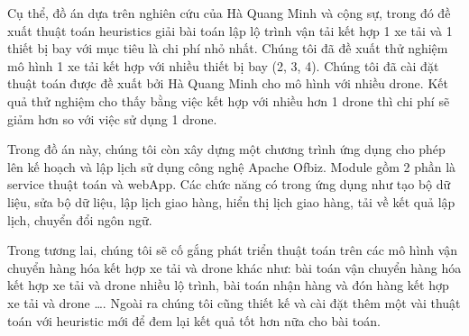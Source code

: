 \documentclass[a4paper,12pt]{report}
\begin{document}
Cụ thể, đồ án dựa trên nghiên cứu của Hà Quang Minh và cộng sự, trong đó đề xuất thuật toán heuristics giải bài toán lập lộ trình vận tải kết hợp 1 xe tải và 1 thiết bị bay với mục tiêu là chi phí nhỏ nhất. Chúng tôi đã đề xuất thử nghiệm mô hình 1 xe tải kết hợp với nhiều thiết bị bay (2, 3, 4). Chúng tôi đã cài đặt thuật toán được đề xuất bởi Hà Quang Minh cho mô hình với nhiều drone. Kết quả thử nghiệm cho thấy bằng việc kết hợp với nhiều hơn 1 drone thì chi phí sẽ giảm hơn so với việc sử dụng 1 drone.

Trong đồ án này, chúng tôi còn xây dựng một chương trình ứng dụng cho phép lên kế hoạch và lập lịch sử dụng công nghệ Apache Ofbiz. Module gồm 2 phần là service thuật toán và webApp. Các chức năng có trong ứng dụng như tạo bộ dữ liệu, sửa bộ dữ liệu, lập lịch giao hàng, hiển thị lịch giao hàng, tải về kết quả lập lịch, chuyển đổi ngôn ngữ. 

Trong tương lai, chúng tôi sẽ cố gắng phát triển thuật toán trên các mô hình vận chuyển hàng hóa kết hợp xe tải và drone khác như: bài toán vận chuyển hàng hóa kết hợp xe tải và drone nhiều lộ trình, bài toán nhận hàng và đón hàng kết hợp xe tải và drone \ldots. Ngoài ra chúng tôi cũng thiết kế và cài đặt thêm một vài thuật toán với heuristic mới để đem lại kết quả tốt hơn nữa cho bài toán.
\end{document}
